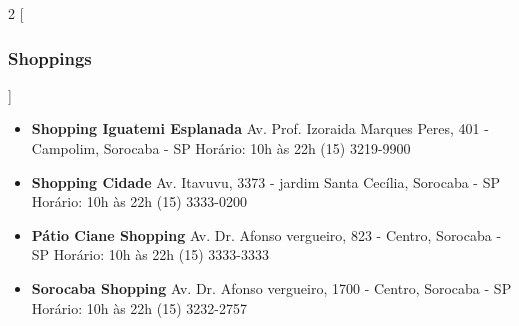 \begin{multicols}{2}
  [
  \subsubsection{Shoppings}
  ]
  \begin{itemize}
    \item \textbf{Shopping Iguatemi Esplanada}
      \newline Av. Prof. Izoraida Marques Peres, 401 - Campolim, Sorocaba - SP
      \newline Horário: 10h às 22h
      \newline (15) 3219-9900
  \end{itemize}
  \begin{itemize}
    \item \textbf{Shopping Cidade}
      \newline Av. Itavuvu, 3373 - jardim Santa Cecília, Sorocaba - SP
      \newline Horário: 10h às 22h
      \newline (15) 3333-0200
  \end{itemize}
  \begin{itemize}
    \item \textbf{Pátio Ciane Shopping}
      \newline Av. Dr. Afonso vergueiro, 823 - Centro, Sorocaba - SP
      \newline Horário: 10h às 22h
      \newline (15) 3333-3333
  \end{itemize}
  \begin{itemize}
    \item \textbf{Sorocaba Shopping}
      \newline Av. Dr. Afonso vergueiro, 1700 - Centro, Sorocaba - SP
      \newline Horário: 10h às 22h
      \newline (15) 3232-2757
  \end{itemize}
\end{multicols}

